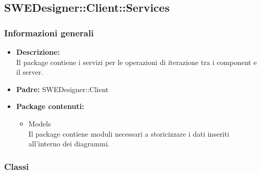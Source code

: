     \subsection{SWEDesigner::Client::Services}
		\subsubsection{Informazioni generali}
			\begin{itemize}
          		\item \textbf{Descrizione:}\\
          		Il package contiene i servizi per le operazioni di iterazione tra i component e il server.
          		\item \textbf{Padre:} SWEDesigner::Client
          		\item \textbf{Package contenuti:}\\
          		\begin{itemize}
          			\item Models\\
          			Il package contiene moduli necessari a storicizzare i dati inseriti all’interno dei diagrammi.
          		\end{itemize}
          	\end{itemize}
		\subsubsection{Classi}
